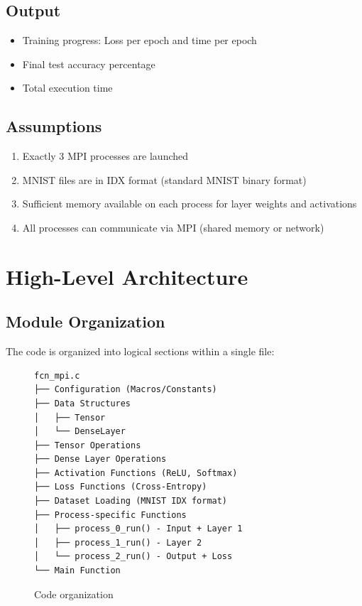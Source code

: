 \documentclass[11pt,a4paper]{article}
\begin{document}
\subsection{Output}

\begin{itemize}
    \item Training progress: Loss per epoch and time per epoch
    \item Final test accuracy percentage
    \item Total execution time
\end{itemize}

\subsection{Assumptions}

\begin{enumerate}
    \item Exactly 3 MPI processes are launched
    \item MNIST files are in IDX format (standard MNIST binary format)
    \item Sufficient memory available on each process for layer weights and activations
    \item All processes can communicate via MPI (shared memory or network)
\end{enumerate}

\section{High-Level Architecture}

\subsection{Module Organization}

The code is organized into logical sections within a single file:

\begin{figure}[h]
\centering
\begin{tcolorbox}[colback=gray!10,colframe=gray!50,width=0.9\textwidth]
\begin{verbatim}
fcn_mpi.c
├── Configuration (Macros/Constants)
├── Data Structures
│   ├── Tensor
│   └── DenseLayer
├── Tensor Operations
├── Dense Layer Operations
├── Activation Functions (ReLU, Softmax)
├── Loss Functions (Cross-Entropy)
├── Dataset Loading (MNIST IDX format)
├── Process-specific Functions
│   ├── process_0_run() - Input + Layer 1
│   ├── process_1_run() - Layer 2
│   └── process_2_run() - Output + Loss
└── Main Function
\end{verbatim}
\end{tcolorbox}
\caption{Code organization}
\end{figure}
\end{document}
